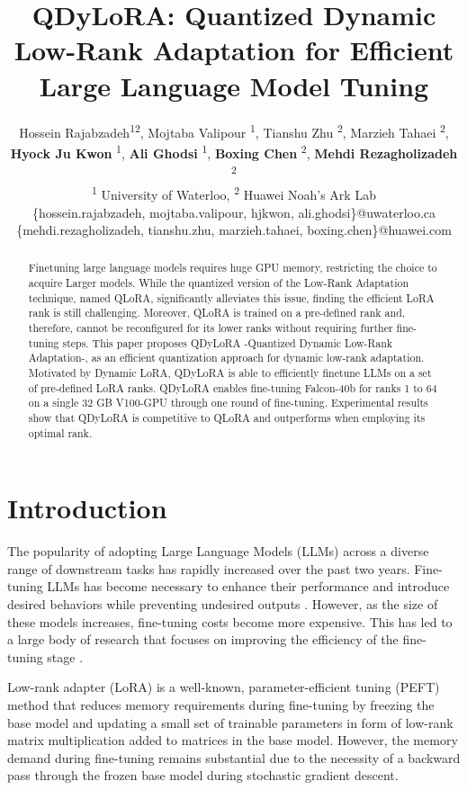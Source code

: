 \documentclass[11pt]{article}
\title{QDyLoRA: Quantized Dynamic Low-Rank Adaptation for Efficient Large Language Model Tuning}
\author{
    Hossein Rajabzadeh\textsuperscript{\rm 1}\textsuperscript{\rm 2},
    Mojtaba Valipour \textsuperscript{\rm 1}, 
    Tianshu Zhu \textsuperscript{\rm 2},
    Marzieh Tahaei \textsuperscript{\rm 2},\\
    \textbf{Hyock Ju Kwon} \textsuperscript{\rm 1},  
    \textbf{Ali Ghodsi} \textsuperscript{\rm 1},
    \textbf{Boxing Chen} \textsuperscript{\rm 2},
    \textbf{Mehdi Rezagholizadeh} \textsuperscript{\rm 2} \\
    \textsuperscript{\rm 1} University of Waterloo,
    \textsuperscript{\rm 2} Huawei Noah's Ark Lab\\
    \small{\textmd{\{hossein.rajabzadeh, mojtaba.valipour, hjkwon, ali.ghodsi\}@uwaterloo.ca}} \\
    \small{\textmd{\{mehdi.rezagholizadeh, tianshu.zhu, marzieh.tahaei, boxing.chen\}@huawei.com}} \\
}
\begin{document}
\maketitle
\begin{abstract}
Finetuning large language models requires huge GPU memory, restricting the choice to acquire Larger models. While the quantized version of the Low-Rank Adaptation technique, named QLoRA, significantly alleviates this issue, finding the efficient LoRA rank is still challenging. Moreover, QLoRA is trained on a pre-defined rank and, therefore, cannot be reconfigured for its lower ranks without requiring further fine-tuning steps. This paper proposes QDyLoRA -Quantized Dynamic Low-Rank Adaptation-, as an efficient quantization approach for dynamic low-rank adaptation. Motivated by Dynamic LoRA, QDyLoRA is able to efficiently finetune LLMs on a set of pre-defined LoRA ranks. QDyLoRA enables fine-tuning Falcon-40b for ranks  1 to 64 on a single 32 GB V100-GPU through one round of fine-tuning. Experimental results show that QDyLoRA is competitive to QLoRA and outperforms when employing its optimal rank.
\end{abstract}

\section{Introduction}



The popularity of adopting Large Language Models (LLMs) across a diverse range of downstream tasks has rapidly increased over the past two years. Fine-tuning LLMs has become necessary to enhance their performance and introduce desired behaviors while preventing undesired outputs \cite{ding2023parameter}. However, as the size of these models increases, fine-tuning costs become more expensive. This has led to a large body of research that focuses on improving the efficiency of the fine-tuning stage \cite{liu2022few,mao2021unipelt,hu2021lora,edalati2022krona,sung2022lst}. 

Low-rank adapter (LoRA) \cite{hu2021lora} is a well-known, parameter-efficient tuning (PEFT) method that reduces memory requirements during fine-tuning by freezing the base model and updating a small set of trainable parameters in form of low-rank matrix multiplication added to matrices in the base model. However, the memory demand during fine-tuning remains substantial due to the necessity of a backward pass through the frozen base model during stochastic gradient descent.
\end{document}
